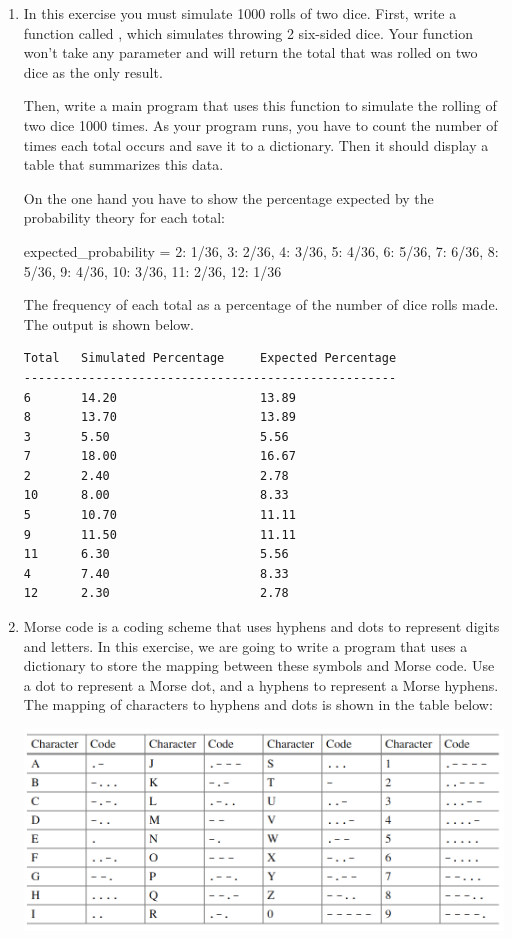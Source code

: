 \documentclass[
  fontsize=10pt,
  a4paper,
]{scrartcl}
\begin{document}
\begin{enumerate}
\item In this exercise you must simulate 1000 rolls of two dice. First, write a function called , which simulates throwing 2 six-sided dice. Your function won't take any parameter and will return the total that was rolled on two dice as the only result.

Then, write a main program that uses this function to simulate the rolling of two dice 1000 times. As your program runs, you have to count the number of times each total occurs and save it to a dictionary. Then it should display a table that summarizes this data.

On the one hand you have to show the percentage expected by the probability theory for each total:

\begin{python}
expected_probability = {2: 1/36, 3: 2/36, 4: 3/36, 5: 4/36, 
                         6: 5/36, 7: 6/36, 8: 5/36, 9: 4/36, 
                         10: 3/36, 11: 2/36, 12: 1/36
                        }
\end{python}

The frequency of each total as a percentage of the number of dice rolls made. The output is shown below.

\begin{verbatim}
Total   Simulated Percentage     Expected Percentage
----------------------------------------------------
6       14.20                    13.89
8       13.70                    13.89
3       5.50                     5.56
7       18.00                    16.67
2       2.40                     2.78
10      8.00                     8.33
5       10.70                    11.11
9       11.50                    11.11
11      6.30                     5.56
4       7.40                     8.33
12      2.30                     2.78
\end{verbatim}


\item Morse code is a coding scheme that uses hyphens and dots to represent digits and letters. In this exercise, we are going to write a program that uses a dictionary to store the mapping between these symbols and Morse code. Use a dot to represent a Morse dot, and
a hyphens to represent a Morse hyphens. The mapping of characters to hyphens and dots is
shown in the table below:

\includegraphics[width=14cm]{images/morse.png}


\end{enumerate}
\end{document}
